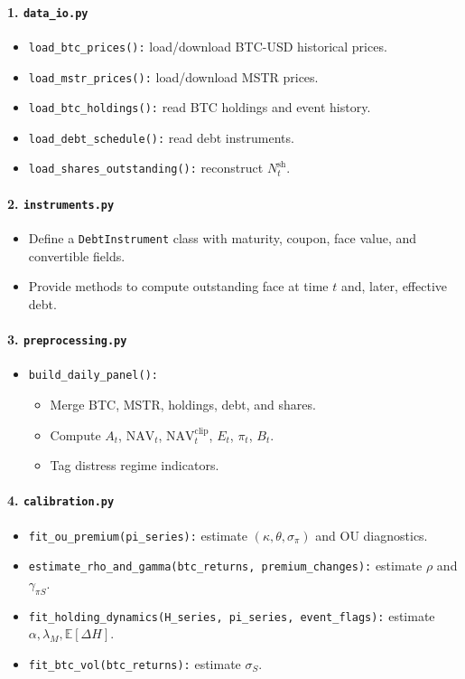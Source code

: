 \documentclass[11pt]{article}
\begin{document}
\paragraph{1. \texttt{data\_io.py}}
\begin{itemize}
  \item \texttt{load\_btc\_prices():} load/download BTC-USD historical prices.
  \item \texttt{load\_mstr\_prices():} load/download MSTR prices.
  \item \texttt{load\_btc\_holdings():} read BTC holdings and event history.
  \item \texttt{load\_debt\_schedule():} read debt instruments.
  \item \texttt{load\_shares\_outstanding():} reconstruct $N_t^{\text{sh}}$.
\end{itemize}

\paragraph{2. \texttt{instruments.py}}
\begin{itemize}
  \item Define a \texttt{DebtInstrument} class with maturity, coupon, face value, and convertible fields.
  \item Provide methods to compute outstanding face at time $t$ and, later, effective debt.
\end{itemize}

\paragraph{3. \texttt{preprocessing.py}}
\begin{itemize}
  \item \texttt{build\_daily\_panel():}
  \begin{itemize}
    \item Merge BTC, MSTR, holdings, debt, and shares.
    \item Compute $A_t$, $\text{NAV}_t$, $\text{NAV}_t^{\text{clip}}$, $E_t$, $\pi_t$, $B_t$.
    \item Tag distress regime indicators.
  \end{itemize}
\end{itemize}

\paragraph{4. \texttt{calibration.py}}
\begin{itemize}
  \item \texttt{fit\_ou\_premium(pi\_series):} estimate $(\kappa,\theta,\sigma_\pi)$ and OU diagnostics.
  \item \texttt{estimate\_rho\_and\_gamma(btc\_returns, premium\_changes):} estimate $\rho$ and $\gamma_{\pi S}$.
  \item \texttt{fit\_holding\_dynamics(H\_series, pi\_series, event\_flags):} estimate $\alpha,\lambda_M,\mathbb E[\Delta H]$.
  \item \texttt{fit\_btc\_vol(btc\_returns):} estimate $\sigma_S$.
\end{itemize}
\end{document}
